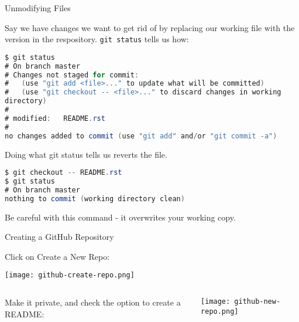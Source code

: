 \documentclass{beamer}
\begin{document}
\begin{frame}[fragile]{Unmodifying Files}


Say we have changes we want to get rid of by replacing our working file with the version in the respository. {\tt git status} tells us how:

\begin{lstlisting}[language=Java]
$ git status
# On branch master
# Changes not staged for commit:
#   (use "git add <file>..." to update what will be committed)
#   (use "git checkout -- <file>..." to discard changes in working
directory)
#
# modified:   README.rst
#
no changes added to commit (use "git add" and/or "git commit -a")
\end{lstlisting}

Doing what git status tells us reverts the file.

\begin{lstlisting}[language=Java]
$ git checkout -- README.rst
$ git status
# On branch master
nothing to commit (working directory clean)
\end{lstlisting}
Be careful with this command - it overwrites your working copy.

\end{frame}

\begin{frame}[fragile]{Creating a GitHub Repository}

\vspace{-.1in}
Click on Create a New Repo:

\begin{center}
\texttt{[image: github-create-repo.png]}
\end{center}

\begin{columns}[c]
\begin{column}{2in}
Make it private, and check the option to create a README:
\end{column}
\begin{column}{3in}
\texttt{[image: github-new-repo.png]}
\end{column}
\end{columns}


\end{frame}
\end{document}
